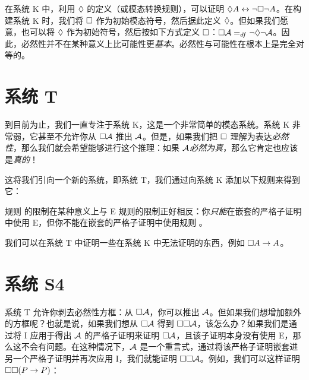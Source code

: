 在系统 K 中，利用 $\Diamond$ 的定义（或模态转换规则），可以证明 $\Diamond A \leftrightarrow \neg\Box\neg A$。在构建系统 K 时，我们将 $\Box$ 作为初始模态符号，然后据此定义 $\Diamond$。但如果我们愿意，也可以将 $\Diamond$ 作为初始符号，然后按如下方式定义 $\Box$：$\Box\mathcal{A} =_{df} \neg \Diamond \neg \mathcal{A}$。因此，必然性并不在某种意义上比可能性更\emph{基本}。必然性与可能性在根本上是完全对等的。

\section{系统 T}
\label{T}

到目前为止，我们一直专注于系统 K，这是一个非常简单的模态系统。系统 K 非常弱，它甚至不允许你从 $\Box\mathcal{A}$ 推出 $\mathcal{A}$。但是，如果我们把 $\Box$ 理解为表达\emph{必然性}，那么我们就会希望能够进行这个推理：如果 $\mathcal{A}$\emph{必然为真}，那么它肯定也应该是\emph{真的}！

这将我们引向一个新的系统，即系统 T，我们通过向系统 K 添加以下规则来得到它：

规则 \mlT{} 的限制在某种意义上与 \ebox E 规则的限制正好相反：你\emph{只能}在嵌套的严格子证明中使用 \ebox E，但你不能在嵌套的严格子证明中使用规则 \mlT{}。

我们可以在系统 T 中证明一些在系统 K 中无法证明的东西，例如 $\Box A \rightarrow A$。

\section{系统 S4}
\label{S4}

系统 T 允许你剥去必然性方框：从 $\Box \mathcal{A}$，你可以推出 $\mathcal{A}$。但如果我们想增加额外的方框呢？也就是说，如果我们想从 $\Box\mathcal{A}$ 得到 $\Box\Box\mathcal{A}$，该怎么办？如果我们是通过将 \ebox I 应用于得出 $\mathcal{A}$ 的严格子证明来证明 $\Box\mathcal{A}$，且该子证明本身没有使用 \ebox E，那么这不会有问题。在这种情况下，$\mathcal{A}$ 是一个重言式，通过将该严格子证明嵌套进另一个严格子证明并再次应用 \ebox I，我们就能证明 $\Box\Box \mathcal{A}$。例如，我们可以这样证明 $\Box\Box (P\rightarrow P)$：

\begin{fitchproof}
		\open
		\AS
		\open
		\AS
		\open
		\AS
		\close
		\close
		\close
\end{fitchproof}


